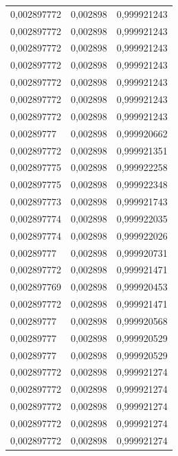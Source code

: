 \begin{center}
\begin{longtable}{|l|l|l|}
0,002897772        & 0,002898              & 0,999921243  \\
0,002897772        & 0,002898              & 0,999921243  \\
0,002897772        & 0,002898              & 0,999921243  \\
0,002897772        & 0,002898              & 0,999921243  \\
0,002897772        & 0,002898              & 0,999921243  \\
0,002897772        & 0,002898              & 0,999921243  \\
0,002897772        & 0,002898              & 0,999921243  \\
0,00289777         & 0,002898              & 0,999920662  \\
0,002897772        & 0,002898              & 0,999921351  \\
0,002897775        & 0,002898              & 0,999922258  \\
0,002897775        & 0,002898              & 0,999922348  \\
0,002897773        & 0,002898              & 0,999921743  \\
0,002897774        & 0,002898              & 0,999922035  \\
0,002897774        & 0,002898              & 0,999922026  \\
0,00289777         & 0,002898              & 0,999920731  \\
0,002897772        & 0,002898              & 0,999921471  \\
0,002897769        & 0,002898              & 0,999920453  \\
0,002897772        & 0,002898              & 0,999921471  \\
0,00289777         & 0,002898              & 0,999920568  \\
0,00289777         & 0,002898              & 0,999920529  \\
0,00289777         & 0,002898              & 0,999920529  \\
0,002897772        & 0,002898              & 0,999921274  \\
0,002897772        & 0,002898              & 0,999921274  \\
0,002897772        & 0,002898              & 0,999921274  \\
0,002897772        & 0,002898              & 0,999921274  \\
0,002897772        & 0,002898              & 0,999921274  \\

\end{longtable}
\end{center}
